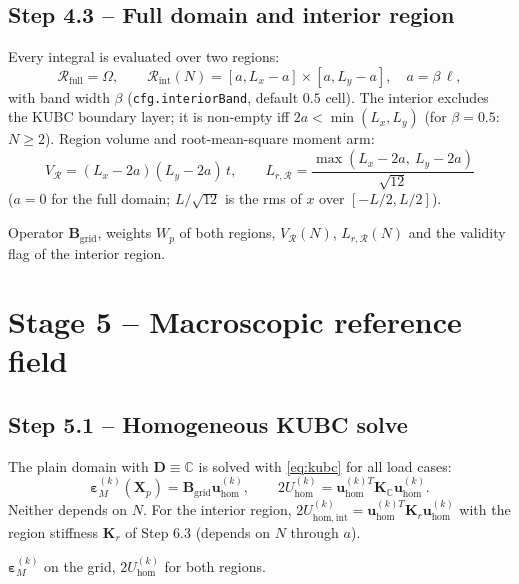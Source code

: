 \documentclass[11pt,a4paper]{article}
\newcommand{\C}{\mathbb{C}}                     %
\newcommand{\Dm}{\mathbf{D}}                    %
\newcommand{\epsM}{\bm{\varepsilon}_{M}}
\newcommand{\bX}{\bm{X}}
\newcommand{\bu}{\bm{u}}
\newcommand{\bK}{\bm{K}}
\newcommand{\code}[1]{\texttt{#1}}
\theoremstyle{plain}
\theoremstyle{remark}
\begin{document}
\subsection*{Step 4.3 -- Full domain and interior region}
Every integral is evaluated over two regions:
\begin{equation}
  \mathcal R_{\mathrm{full}}=\Omega,\qquad
  \mathcal R_{\mathrm{int}}(N)=[a,L_x-a]\times[a,L_y-a],\quad a=\beta\,\ell ,
  \label{eq:regions}
\end{equation}
with band width $\beta$ (\code{cfg.interiorBand}, default $0.5$ cell). The interior excludes the
KUBC boundary layer; it is non-empty iff $2a<\min(L_x,L_y)$ (for $\beta=0.5$: $N\ge2$). Region
volume and root-mean-square moment arm:
\begin{equation}
  V_{\mathcal R}=(L_x-2a)(L_y-2a)\,t,\qquad
  L_{r,\mathcal R}=\frac{\max(L_x-2a,\ L_y-2a)}{\sqrt{12}}
  \label{eq:VL}
\end{equation}
($a=0$ for the full domain; $L/\sqrt{12}$ is the rms of $x$ over $[-L/2,L/2]$).
\begin{delivers}
Operator $\bm B_{\mathrm{grid}}$, weights $W_p$ of both regions, $V_{\mathcal R}(N)$,
$L_{r,\mathcal R}(N)$ and the validity flag of the interior region.
\end{delivers}

\section{Stage 5 -- Macroscopic reference field}
\label{sec:stage5}
\subsection*{Step 5.1 -- Homogeneous KUBC solve}
The plain domain with $\Dm\equiv\C$ is solved with \eqref{eq:kubc} for all load cases:
\begin{equation}
  \epsM^{(k)}(\bX_p)=\bm B_{\mathrm{grid}}\bu_{\mathrm{hom}}^{(k)},\qquad
  2U^{(k)}_{\mathrm{hom}}=\bu_{\mathrm{hom}}^{(k)T}\bK_{\C}\bu_{\mathrm{hom}}^{(k)} .
  \label{eq:stage1}
\end{equation}
Neither depends on $N$. For the interior region, $2U^{(k)}_{\mathrm{hom},\mathrm{int}}
=\bu_{\mathrm{hom}}^{(k)T}\bK_{r}\bu_{\mathrm{hom}}^{(k)}$ with the region stiffness $\bK_r$ of
Step 6.3 (depends on $N$ through $a$).
\begin{delivers}
$\epsM^{(k)}$ on the grid, $2U^{(k)}_{\mathrm{hom}}$ for both regions.
\end{delivers}
\end{document}
